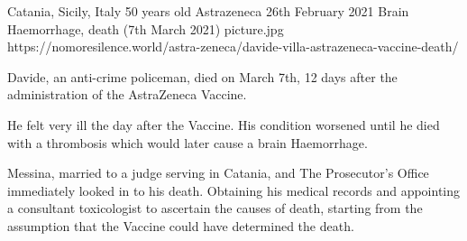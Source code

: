 {Catania, Sicily, Italy}
{50 years old}
{Astrazeneca}
{26th February 2021}
{Brain Haemorrhage, death (7th March 2021)}
{picture.jpg}
{https://nomoresilence.world/astra-zeneca/davide-villa-astrazeneca-vaccine-death/}
{

Davide, an anti-crime policeman, died on March 7th, 12 days after the
administration of the AstraZeneca Vaccine.

He felt very ill the day after the Vaccine. His condition worsened until he died
with a thrombosis which would later cause a brain Haemorrhage.

Messina, married to a judge serving in Catania, and The Prosecutor’s Office
immediately looked in to his death. Obtaining his medical records and appointing
a consultant toxicologist to ascertain the causes of death, starting from the
assumption that the Vaccine could have determined the death.

}
